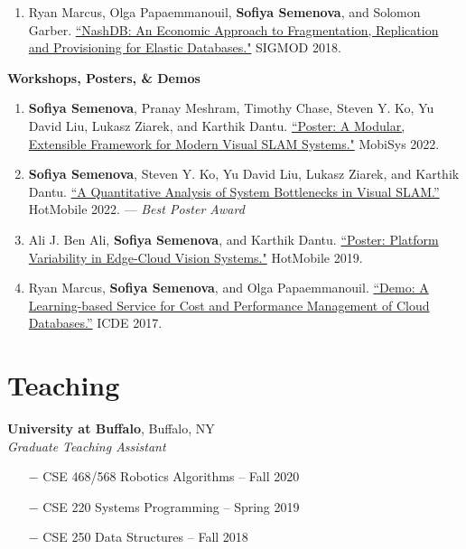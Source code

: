 \documentclass[margin,line]{res}
\begin{document}
\begin{resume}
\begin{enumerate}
	\item Ryan Marcus, Olga Papaemmanouil, \textbf{Sofiya Semenova}, and Solomon Garber. \href{https://dl.acm.org/doi/10.1145/3183713.3196935}{``NashDB: An Economic Approach to Fragmentation, Replication and Provisioning for Elastic Databases."} SIGMOD 2018.
\end{enumerate} 

\textbf{Workshops, Posters, \& Demos}

\begin{enumerate}
	\item \textbf{Sofiya Semenova}, Pranay Meshram, Timothy Chase, Steven Y. Ko, Yu David Liu, Lukasz Ziarek, and Karthik Dantu. \href{https://dl.acm.org/doi/abs/10.1145/3498361.3538793}{``Poster: A Modular, Extensible Framework for Modern Visual SLAM Systems."} MobiSys 2022.
	
	\item \textbf{Sofiya Semenova}, Steven Y. Ko, Yu David Liu, Lukasz Ziarek, and Karthik Dantu. \href{https://dl.acm.org/doi/10.1145/3508396.3512882}{``A Quantitative Analysis of System Bottlenecks in Visual SLAM.”} HotMobile 2022. --- \textit{Best Poster Award}

	\item Ali J. Ben Ali, \textbf{Sofiya Semenova}, and Karthik Dantu. \href{https://dl.acm.org/doi/10.1145/3301293.3309555}{``Poster: Platform Variability in Edge-Cloud Vision Systems."} HotMobile 2019.
	
		\item Ryan Marcus,  \textbf{Sofiya Semenova}, and Olga Papaemmanouil. \href{https://www.cs.brandeis.edu/~olga/publications/icde17-demo.pdf} {``Demo: A Learning-based Service for Cost and Performance Management of Cloud Databases.”} ICDE 2017.

\end{enumerate}


\section{\sc Teaching}

{\bf University at Buffalo}, Buffalo, NY \\
{\em Graduate Teaching Assistant}

\begin{itemize}
  \setlength\itemsep{-.2em}
  \item[$-$] CSE 468/568 Robotics Algorithms -- Fall 2020
  \item[$-$] CSE 220 Systems Programming -- Spring 2019
  \item[$-$] CSE 250 Data Structures -- Fall 2018
\end{itemize}


\end{resume}
\end{document}
